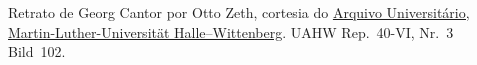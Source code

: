 Retrato de Georg Cantor por Otto Zeth, cortesia do
\href{http://www.archiv.uni-halle.de/}{Arquivo Universitário,
Martin-Luther-Universität Halle--Wittenberg}. UAHW Rep.~40-VI, Nr.~3
Bild~102.
